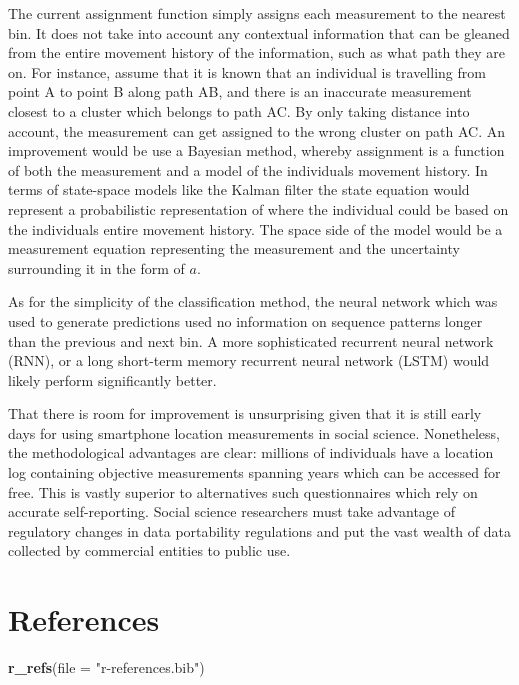 \documentclass[man]{apa6}
\newenvironment{Shaded}{\begin{snugshade}}{\end{snugshade}}
\newcommand{\KeywordTok}[1]{\textcolor[rgb]{0.13,0.29,0.53}{\textbf{#1}}}
\newcommand{\DataTypeTok}[1]{\textcolor[rgb]{0.13,0.29,0.53}{#1}}
\newcommand{\StringTok}[1]{\textcolor[rgb]{0.31,0.60,0.02}{#1}}
\newcommand{\NormalTok}[1]{#1}
\theoremstyle{definition}
\theoremstyle{definition}
\theoremstyle{definition}
\theoremstyle{remark}
\begin{document}
The current assignment function simply assigns each measurement to the
nearest bin. It does not take into account any contextual information
that can be gleaned from the entire movement history of the information,
such as what path they are on. For instance, assume that it is known
that an individual is travelling from point A to point B along path AB,
and there is an inaccurate measurement closest to a cluster which
belongs to path AC. By only taking distance into account, the
measurement can get assigned to the wrong cluster on path AC. An
improvement would be use a Bayesian method, whereby assignment is a
function of both the measurement and a model of the individuals movement
history. In terms of state-space models like the Kalman filter the state
equation would represent a probabilistic representation of where the
individual could be based on the individuals entire movement history.
The space side of the model would be a measurement equation representing
the measurement and the uncertainty surrounding it in the form of \(a\).

As for the simplicity of the classification method, the neural network
which was used to generate predictions used no information on sequence
patterns longer than the previous and next bin. A more sophisticated
recurrent neural network (RNN), or a long short-term memory recurrent
neural network (LSTM) would likely perform significantly better.

That there is room for improvement is unsurprising given that it is
still early days for using smartphone location measurements in social
science. Nonetheless, the methodological advantages are clear: millions
of individuals have a location log containing objective measurements
spanning years which can be accessed for free. This is vastly superior
to alternatives such questionnaires which rely on accurate
self-reporting. Social science researchers must take advantage of
regulatory changes in data portability regulations and put the vast
wealth of data collected by commercial entities to public use.

\newpage

\section{References}\label{references}

\begin{Shaded}
\begin{Highlighting}[]
\KeywordTok{r_refs}\NormalTok{(}\DataTypeTok{file =} \StringTok{"r-references.bib"}\NormalTok{)}
\end{Highlighting}
\end{Shaded}
\end{document}
